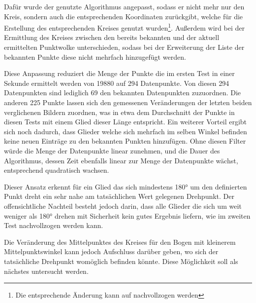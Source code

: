 Dafür wurde der genutzte Algorithmus angepasst, sodass er nicht mehr nur den Kreis, sondern auch die entsprechenden Koordinaten zurückgibt, welche für die Erstellung des entsprechenden Kreises genutzt wurden\footnote{Die entsprechende Änderung kann auf  nachvollzogen werden}.
Außerdem wird bei der Ermittlung des Kreises zwischen den bereits bekannten und der aktuell ermittelten Punktwolke unterschieden, sodass bei der Erweiterung der Liste der bekannten Punkte diese nicht mehrfach hinzugefügt werden.

Diese Anpassung reduziert die Menge der Punkte die im ersten Test in einer Sekunde ermittelt werden von 19880 auf 294 Datenpunkte.
Von diesen 294 Datenpunkten sind lediglich 69 den bekannten Datenpunkten zuzuordnen.
Die anderen 225 Punkte lassen sich den gemessenen Veränderungen der letzten beiden verglichenen Bildern zuordnen, was in etwa dem Durchschnitt der Punkte in diesen Tests mit einem Glied dieser Länge entspricht.
Ein weiterer Vorteil ergibt sich noch dadurch, dass Glieder welche sich mehrfach im selben Winkel befinden keine neuen Einträge zu den bekannten Punkten hinzufügen.
Ohne diesen Filter würde die Menge der Datenpunkte linear zunehmen, und die Dauer des Algorithmus, dessen Zeit ebenfalls linear zur Menge der Datenpunkte wächst, entsprechend quadratisch wachsen.


Dieser Ansatz erkennt für ein Glied das sich mindestens 180° um den definierten Punkt dreht ein sehr nahe am tatsächlichen Wert gelegenen Drehpunkt.
Der offensichtliche Nachteil besteht jedoch darin, dass alle Glieder die sich um weit weniger als 180° drehen mit Sicherheit kein gutes Ergebnis liefern, wie im zweiten Test nachvollzogen werden kann.

Die Veränderung des Mittelpunktes des Kreises für den Bogen mit kleinerem Mittelpunktswinkel kann jedoch Aufschluss darüber geben, wo sich der tatsächliche Drehpunkt womöglich befinden könnte.
Diese Möglichkeit soll als nächstes untersucht werden.


